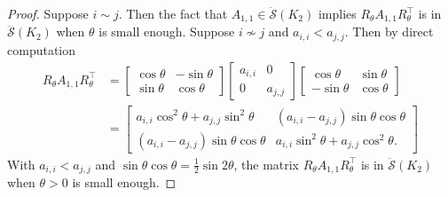\documentclass[10pt,a4paper]{amsart}
\newcommand{\mdso}{\ddot{\mathcal{S}}}
\newcommand{\trans}{^\top}
\begin{document}
\begin{proof}
Suppose $i \sim j$.  Then the fact that $A_{1,1}\in\mdso(K_2)$ implies $R_\theta A_{1,1} R_\theta\trans$ is in $\mdso(K_2)$ when $\theta$ is small enough.  Suppose $i \nsim j$ and $a_{i,i} < a_{j,j}$.  Then by direct computation
\[
    \begin{aligned}
    R_\theta A_{1,1} R_\theta\trans &= 
    \begin{bmatrix} \cos\theta & -\sin\theta \\ \sin\theta & \cos\theta \end{bmatrix}
    \begin{bmatrix} a_{i,i} & 0 \\ 0 & a_{j,j} \end{bmatrix}
    \begin{bmatrix} \cos\theta & \sin\theta \\ -\sin\theta & \cos\theta \end{bmatrix} \\
    &= \begin{bmatrix}
        a_{i,i}\cos^2\theta + a_{j,j}\sin^2\theta & (a_{i,i} - a_{j,j})\sin\theta\cos\theta \\
        (a_{i,i} - a_{j,j})\sin\theta\cos\theta & a_{i,i}\sin^2\theta + a_{j,j}\cos^2\theta. 
    \end{bmatrix}
    \end{aligned}
\]
With $a_{i,i} < a_{j,j}$ and $\sin\theta\cos\theta = \frac{1}{2}\sin 2\theta$, the matrix $R_\theta A_{1,1} R_\theta\trans$ is in $\mdso(K_2)$ when $\theta > 0$ is small enough.
\end{proof}
\end{document}
